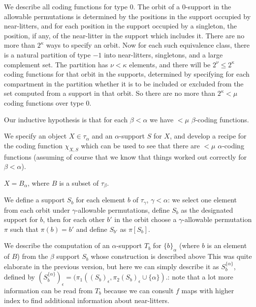 \documentclass[112pt]{article}
\begin{document}
\begin{description}

\item[Analysis of coding functions for type 0:]  We describe all coding functions for type 0.  The orbit of a 0-support in the allowable permutations is determined by the positions in the support  occupied by near-litters, and for each position in the support occupied by a singleton, the position, if any, of the near-litter in the support  which includes it.  There are no more than $2^\kappa$ ways to specify an orbit.  Now for each such equivalence class, there is a natural partition of type $-1$ into near-litters, singletons, and a large complement set.  The partition has $\nu<\kappa$ elements, and there will be $2^\nu\leq 2^\kappa$ coding functions for that orbit in the supports, determined by specifying for each compartment in the partition whether it is to be included or excluded from the set computed from a support in that orbit.  So there are no more than $2^\kappa<\mu$ coding functions over type 0.

\item[Analysis of the general case:]  

\item
Our inductive hypothesis is that for each $\beta<\alpha$ we have $<\mu$ $\beta$-coding functions.



We specify an object $X\in \tau_\alpha$ and an $\alpha$-support $S$ for $X$, and develop a recipe for the coding function $\chi_{X,S}$ which can be used to see that there are $<\mu$ $\alpha$-coding functions (assuming of course that we know that things worked out correctly for $\beta<\alpha$).

$X = B_\alpha$, where $B$ is a subset of $\tau_\beta$.  

We define a support $S_b$ for each element $b$ of $\tau_\gamma$, $\gamma<\alpha$:  we select one element from each orbit  under $\gamma$-allowable permutations, define $S_b$ as the designated support for $b$, then for each other $b'$ in the orbit choose
a $\gamma$-allowable permutation $\pi$ such that $\pi(b)=b'$ and define $S_{b'}$ as $\pi[S_b]$.

We describe the computation of an $\alpha$-support $T_b$
for $\{b\}_\alpha$ (where $b$ is an element of $B$) from the $\beta$ support $S_b$ whose construction is described above   This was quite elaborate in the previous version, but here we can simply describe it as $S_b^{\{\alpha\}}$, defined by $(S_b^{\{\alpha\}})_\epsilon=(\pi_1((S_b)_\epsilon,\pi_2(S_b)_\epsilon \cup \{\alpha\})$.:  note that a lot more information can be read from $T_b$ because
we can consult $f$ maps with higher index to find additional information about near-litters.


\end{description}
\end{document}
